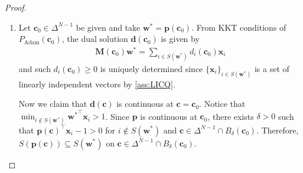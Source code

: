 \documentclass{article} %
\theoremstyle{plain}
\theoremstyle{definition}
\theoremstyle{remark}
\def\bx{{\mathbf x}}
\def\bc{{\mathbf c}}
\def\bp{{\mathbf p}}
\def\bw{{\mathbf w}}
\def\bd{{\mathbf d}}
\def\bv{{\mathbf v}}
\def\bM{{\mathbf M}}
\begin{document}
\begin{proof}
\begin{enumerate}[label=(\alph*)]
    Lastly, consider the case when $\{\mathbf{w}_k\}$ is not bounded. By taking a subsequence, we can assume that $\|\mathbf{w}_k\|_2 \rightarrow \infty$ without loss of generality. Define $\mathbf{v}_k = \frac{\mathbf{w}_k}{\|\mathbf{w}_k\|_2}$. Since $\bv_k$ is bounded, we can take a convergent subsequence and consider $\lim_{k \rightarrow \infty} \mathbf{v}_k = \bar{\mathbf{v}}$ without loss of generality. Then,
    \begin{align*}
        \frac{1}{2} \mathbf{w}_k^\top \bM(\mathbf{c}_k)\mathbf{w}_k \leq \frac{1}{2}\mathbf{u}_k^\top \bM(\mathbf{c}_k)\mathbf{u}_k \Rightarrow \frac{1}{2} \mathbf{v}_k^\top \bM(\mathbf{c}_k)\mathbf{v}_k \leq \frac{1}{2}\left(\frac{\mathbf{u}_k}{\|\mathbf{w}_k\|_2}\right)^\top \bM(\mathbf{c}_k)\left(\frac{\mathbf{u}_k}{\|\mathbf{w}_k\|_2}\right).
    \end{align*}
    Since $f$ is continuous and $\{\mathbf{u}_k\}$ is bounded, we get
    \begin{align*}
        \frac{1}{2} \bar{\mathbf{v}}^\top \bM(\bar{\mathbf{c}})\bar{\mathbf{v}} = f(\bar{\mathbf{v}}, \bar{\mathbf{c}}) =\lim_{k \rightarrow \infty}f(\mathbf{v}_k, \mathbf{c}_k)=\lim_{k \rightarrow \infty}\frac{1}{2} \mathbf{v}_k^\top \bM(\mathbf{c}_k)\mathbf{v}_k \\
        \leq \limsup_{k \rightarrow \infty}\frac{1}{2}\left(\frac{\mathbf{u}_k}{\|\mathbf{w}_k\|}\right)^\top \bM(\mathbf{c}_k)\left(\frac{\mathbf{u}_k}{\|\mathbf{w}_k\|}\right)=0.
    \end{align*}
    Note that $\bM(\bar{\bc})$ is positive definite and $\frac{1}{2}\bar{\mathbf{v}}^\top \bM(\bar{\mathbf{c}})\bar{\mathbf{v}}=0$ implies $\bar{\bv}=0$, which makes a contradiction.

    \item Let $\bc_0 \in \Delta^{N-1}$ be given and take $\bw^* = \bp(\bc_0)$. From KKT conditions of $P_{\text{Adam}}(\bc_0)$, the dual solution $\bd(\bc_0)$ is given by
    \begin{align*}
        \bM(\bc_0)\bw^*=\sum_{i \in S(\bw^*)}d_i(\bc_0)\bx_i
    \end{align*}
    and such $d_i(\bc_0)\geq0$ is uniquely determined since $\{\bx_i\}_{i \in S(\bw^*)}$ is a set of linearly independent vectors by \cref{ass:LICQ}.

    Now we claim that $\bd(\bc)$ is continuous at $\bc = \bc_0$. Notice that $\min_{i \notin S(\bw^*)} {\bw^*}^\top \bx_i > 1$. Since $\bp$ is continuous at $\bc_0$, there exists $\delta>0$ such that $\bp(\bc)^\top\bx_i-1>0$ for $i \notin S(\bw^*)$ and $\bc \in \Delta^{N-1} \cap B_{\delta}(\bc_0)$. Therefore, $S(\bp(\bc)) \subseteq S(\bw^*)$ on $\bc \in \Delta^{N-1} \cap B_{\delta}(\bc_0)$. 
    

\end{enumerate}
\end{proof}
\end{document}
